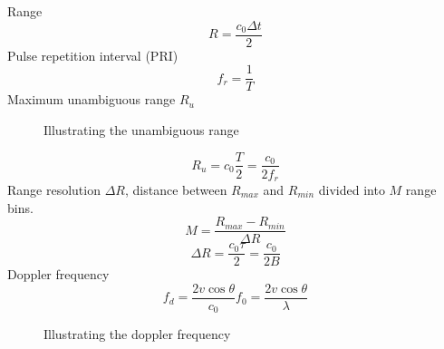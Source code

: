 Range
\begin{equation}
	R = \frac{c_0\Delta t}{2}
\end{equation}
Pulse repetition interval (PRI)
\begin{equation}
	f_r = \frac{1}{T}
\end{equation}
Maximum unambiguous range  $R_u$
\begin{figure}[h]
	\centering
	
	\caption{Illustrating the unambiguous range}
\end{figure} 
\begin{equation}
	R_u = c_0\frac{T}{2} = \frac{c_0}{2f_r}
\end{equation}
Range resolution $\Delta R$, distance between $R_{max}$ and $R_{min}$ divided into $M$ range bins. 
\begin{equation}
	M = \frac{R_{max}-R_{min}}{\Delta R}
\end{equation}
\begin{equation}
	\Delta R = \frac{c_0\tau}{2} = \frac{c_0}{2B}
\end{equation}
Doppler frequency 
\begin{equation}
	f_d = \frac{2 v \cos\theta}{c_0} f_0 = \frac{2v\cos\theta}{\lambda}
\end{equation}
\begin{figure}[h]
	\centering
	
	\caption{Illustrating the doppler frequency}
\end{figure} 